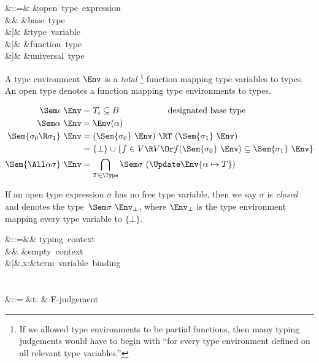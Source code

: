 \documentclass{amsart}
\theoremstyle{definition}
\begin{document}
\label{open-types}

\begin{syntax}
\sigma &::=& &\mbox{open type expression}\\
&& \iota &\mbox{base type}\\
&|& \alpha &\mbox{type variable}\\
&|& \sigma\R\sigma &\mbox{function type}\\
&|& \All\alpha\sigma &\mbox{universal type}
\end{syntax}%

\label{interp-open-types}

A type environment $\Env$ is a \emph{total}%
%
\footnote{%
If we allowed type environments to be partial functions, then
many typing judgements would have to begin with ``for every type
environment defined on all relevant type variables.''
%
} %
function mapping type variables to types. An open type denotes a
function mapping type environments to types.

\begin{align*}
\Sem\iota~\Env &= T_\iota \subseteq B\hspace{2cm}\mbox{designated base type}\\
\Sem\alpha~\Env &= \Env(\alpha)\\
\Sem{\sigma_0\R\sigma_1}~\Env &= (\Sem{\sigma_0}~\Env)\ \RT\ (\Sem{\sigma_1}~\Env)\\
&=\{\bot\}\cup\{f\in V\R V\Or f(\Sem{\sigma_0}~\Env)\subseteq\Sem{\sigma_1}~\Env\}\\
\Sem{\All\alpha\sigma}~\Env &=
\bigcap_{T\in\Type} \Sem\sigma~(\Update\Env{\alpha\mapsto T})
\end{align*}

If an open type expression $\sigma$ has no free type variable,
then we say $\sigma$ is \emph{closed} and denotes the
type~$\Sem\sigma~\Env_\bot$, where $\Env_\bot$ is the type
environment mapping every type variable to $\{\bot\}$.



\begin{syntax}
\Gamma &::=&& \mbox{typing context}\\
&& \emptyset &\mbox{empty context}\\
&|&\Gamma,x:\sigma &\mbox{term variable binding}\\
\\\\
\JF &::=
&\Gamma\vdash t:\sigma
& \mbox{F-judgement}
\end{syntax}
\end{document}
